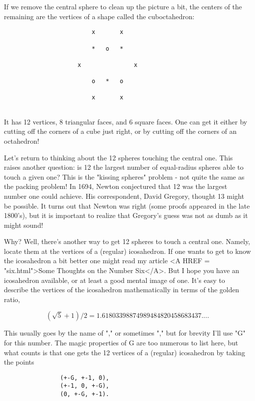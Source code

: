                          
If we remove the central sphere to clean up the picture a bit, the
centers of the remaining are the vertices of a shape called the
cuboctahedron:


\begin{verbatim}
                         x       x   

                         *   o   * 
 
                     x               x

                         o   *   o

                         x       x
                         
\end{verbatim}
    
      
It has 12 vertices, 8 triangular faces, and 6 square faces.  One can get
it either by cutting off the corners of a cube just right, or by cutting
off the corners of an octahedron!

Let's return to thinking about the 12 spheres touching the central one.
This raises another question: is 12 the largest number of equal-radius
spheres able to touch a given one?  This is the "kissing spheres"
problem - not quite the same as the packing problem!  In 1694, Newton
conjectured that 12 was the largest number one could achieve.  His
correspondent, David Gregory, thought 13 might be possible.  It turns
out that Newton was right (some proofs appeared in the late 1800's), but
it is important to realize that Gregory's guess was not as dumb as it
might sound!

Why?  Well, there's another way to get 12 spheres to touch a central
one.  Namely, locate them at the vertices of a (regular) icosahedron.  If one
wants to get to know the icosahedron a bit better one might read my
article <A HREF = "six.html">Some Thoughts on the Number Six</A>.
But I hope you have an icosahedron available, or at least a good mental
image of one.  It's easy to describe the vertices of the icosahedron
mathematically in terms of the golden ratio, 

$$
 (\sqrt 5 + 1)/2 = 1.61803398874989484820458683437....
$$
    
            
This usually goes by the name of "\phi ," or sometimes "\tau ," but for
brevity I'll use "G" for this number.  The magic properties of G are too
numerous to list here, but what counts is that one gets the 12 vertices
of a (regular) icosahedron by taking the points

\begin{verbatim}
                (+-G, +-1, 0),
                (+-1, 0, +-G),
                (0, +-G, +-1).
\end{verbatim}
    

